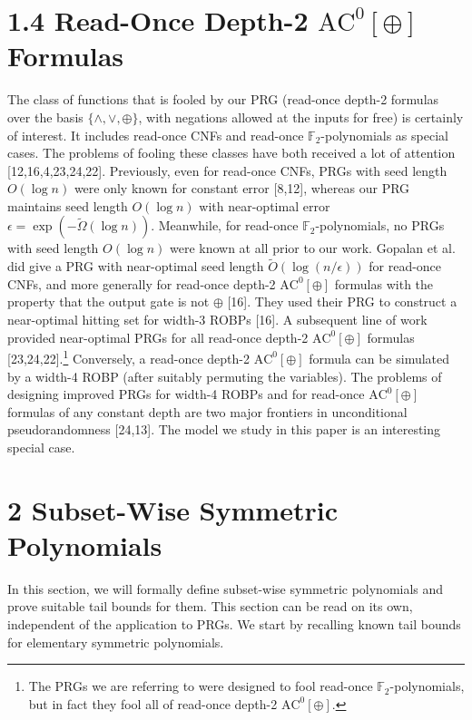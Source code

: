 \documentclass[10pt,a4paper]{article}
\begin{document}
\section*{1.4 Read-Once Depth-2 $\mathrm{AC}^0[\oplus]$ Formulas}
The class of functions that is fooled by our PRG (read-once depth-2 formulas over the basis $\{\wedge,\vee,\oplus\}$, with negations allowed at the inputs for free) is certainly of interest. It includes read-once CNFs and read-once $\mathbb F_2$-polynomials as special cases. The problems of fooling these classes have both received a lot of attention [12,16,4,23,24,22]. Previously, even for read-once CNFs, PRGs with seed length $O(\log n)$ were only known for constant error [8,12], whereas our PRG maintains seed length $O(\log n)$ with near-optimal error $\epsilon=\exp(-\widetilde\Omega(\log n))$. Meanwhile, for read-once $\mathbb F_2$-polynomials, no PRGs with seed length $O(\log n)$ were known at all prior to our work.
Gopalan et al. did give a PRG with near-optimal seed length $\widetilde O(\log(n/\epsilon))$ for read-once CNFs, and more generally for read-once depth-2 $\mathrm{AC}^0[\oplus]$ formulas with the property that the output gate is not $\oplus$ [16]. They used their PRG to construct a near-optimal hitting set for width-3 ROBPs [16]. A subsequent line of work provided near-optimal PRGs for all read-once depth-2 $\mathrm{AC}^0[\oplus]$ formulas [23,24,22].\footnote{The PRGs we are referring to were designed to fool read-once $\mathbb F_2$-polynomials, but in fact they fool all of read-once depth-2 $\mathrm{AC}^0[\oplus]$.}
Conversely, a read-once depth-2 $\mathrm{AC}^0[\oplus]$ formula can be simulated by a width-4 ROBP (after suitably permuting the variables). The problems of designing improved PRGs for width-4 ROBPs and for read-once $\mathrm{AC}^0[\oplus]$ formulas of any constant depth are two major frontiers in unconditional pseudorandomness [24,13]. The model we study in this paper is an interesting special case.

\section*{2 Subset-Wise Symmetric Polynomials}
In this section, we will formally define subset-wise symmetric polynomials and prove suitable tail bounds for them. This section can be read on its own, independent of the application to PRGs. We start by recalling known tail bounds for elementary symmetric polynomials.
\end{document}
